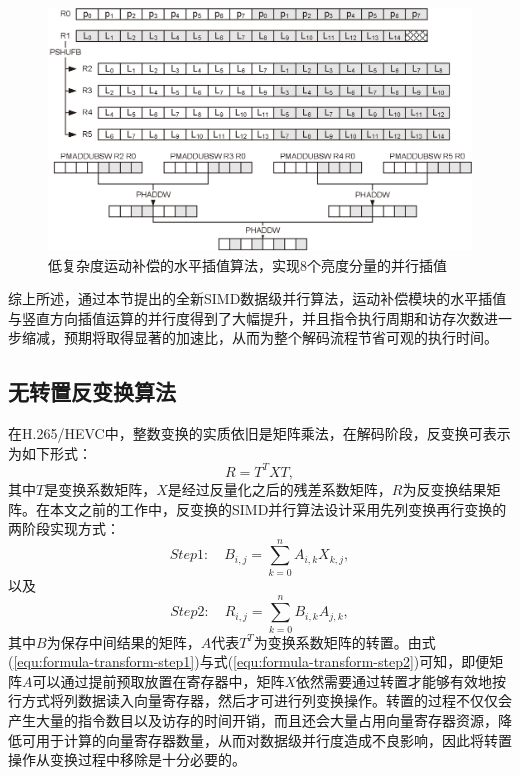 \begin{figure}[!tp]
	\centering
	\includegraphics[width = 0.95\linewidth]{eps/DCT-IF_luma}
	\caption{\label{fig:DCT-IF_luma}
		低复杂度运动补偿的水平插值算法，实现8个亮度分量的并行插值}
\end{figure}

综上所述，通过本节提出的全新SIMD数据级并行算法，运动补偿模块的水平插值与竖直方向插值运算的并行度得到了大幅提升，并且指令执行周期和访存次数进一步缩减，预期将取得显著的加速比，从而为整个解码流程节省可观的执行时间。

\subsection{无转置反变换算法}\label{sec:6.3.4}
在H.265/HEVC中，整数变换的实质依旧是矩阵乘法，在解码阶段，反变换可表示为如下形式：
\begin{equation}
R = T^TXT,
\end{equation}
其中$T$是变换系数矩阵，$X$是经过反量化之后的残差系数矩阵，$R$为反变换结果矩阵。在本文之前的工作中，反变换的SIMD并行算法设计采用先列变换再行变换的两阶段实现方式：
\begin{equation}\label{equ:formula-transform-step1}
Step1:	\quad B_{i,j} = \sum_{k=0}^n A_{i,k}X_{k,j},
\end{equation}
以及
\begin{equation}\label{equ:formula-transform-step2}
Step2:	\quad R_{i,j} = \sum_{k=0}^n B_{i,k}A_{j,k},
\end{equation}
其中$B$为保存中间结果的矩阵，$A$代表$T^T$为变换系数矩阵的转置。由式(\ref{equ:formula-transform-step1})与式(\ref{equ:formula-transform-step2})可知，即便矩阵$A$可以通过提前预取放置在寄存器中，矩阵$X$依然需要通过转置才能够有效地按行方式将列数据读入向量寄存器，然后才可进行列变换操作。转置的过程不仅仅会产生大量的指令数目以及访存的时间开销，而且还会大量占用向量寄存器资源，降低可用于计算的向量寄存器数量，从而对数据级并行度造成不良影响，因此将转置操作从变换过程中移除是十分必要的。

